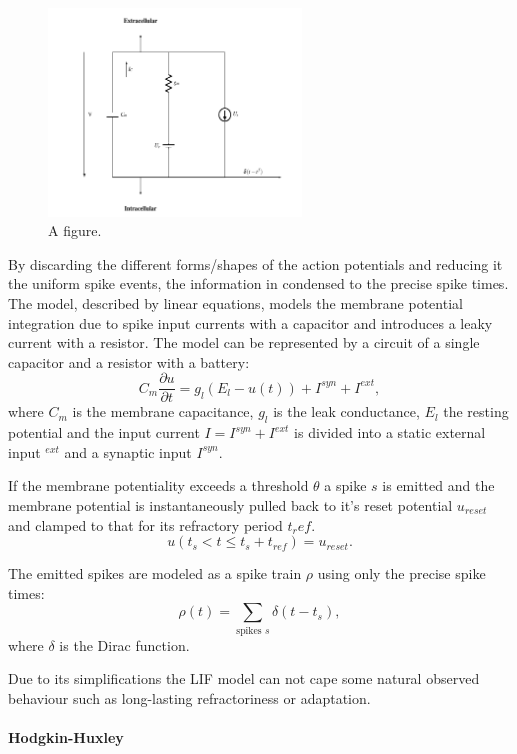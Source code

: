 \begin{figure}
	\centering
    	\includegraphics[width=0.6\textwidth]{imgs/lif.png} 
    \caption{A figure.}
	\label{fig:test}
\end{figure}

By discarding the different forms/shapes of the action potentials and reducing it the uniform spike events, the information in condensed to the precise spike times.
The model, described by linear equations, models the membrane potential integration due to spike input currents with a capacitor and introduces a leaky current with a resistor. 
The model can be represented by a circuit of a single capacitor and a resistor with a battery:
\[
C_m \frac{\partial u}{\partial t} = g_l ( E_l - u(t) ) + I^{syn} + I^{ext} , 
\]
where $C_m$ is the membrane capacitance, $g_l$ is the leak conductance, $E_l$ the resting potential and the input current $I = I^{syn} + I^{ext}$ is divided into a static external input $^{ext}$ and a synaptic input $I^{syn}$.   

If the membrane potentiality exceeds a threshold $\theta$ a spike $s$ is emitted and the membrane potential is  instantaneously pulled back to it's reset potential $u_{reset}$ and clamped to that for its refractory period $t_ref$.
\[
u(t_{s} < t \le t_{s} + t_{ref}) = u_{reset}.
\]

The emitted spikes are modeled as a spike train $\rho$ using only the precise spike times:
\[
\rho(t) = \sum_{\text{spikes } s} \delta(t-t_s),
\] 
where $\delta$ is the Dirac function.

Due to its simplifications the LIF model can not cape some natural observed behaviour such as long-lasting refractoriness or adaptation. 

\paragraph{Hodgkin-Huxley}

